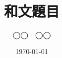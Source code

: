\documentclass{/workdir/classes/thesis}
\affiliation{東京大学大学院新領域創成科学研究科\\人間環境学専攻}
\title{和文題目}
\date{\today}
\author{{◯◯　◯◯}}
\begin{document}
\dominitoc

\maketitle



\frontmatter
\tableofcontents
\listoffigures
\listoftables


\mainmatter









% 

% 

\cleardoublepage
\end{document}
